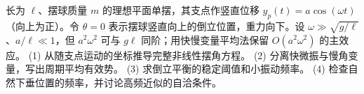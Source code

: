 长为 \(\ell\)、摆球质量 \(m\) 的理想平面单摆，其支点作竖直位移 \(y_p(t)=a\cos(\omega t)\)（向上为正）。令 \(\theta=0\) 表示摆球竖直向上的倒立位置，重力向下。设 \(\omega\gg\sqrt{g/\ell}\)、\(a/\ell\ll1\)，但 \(a^2\omega^2\) 可与 \(g\ell\) 同阶；用快慢变量平均法保留 \(O(a^2\omega^2)\) 的主效应。
(1) 从随支点运动的坐标推导完整非线性摆角方程。
(2) 分离快微振与慢角变量，写出周期平均有效势。
(3) 求倒立平衡的稳定阈值和小振动频率。
(4) 检查自然下垂位置的频率，并讨论高频近似的自洽条件。
